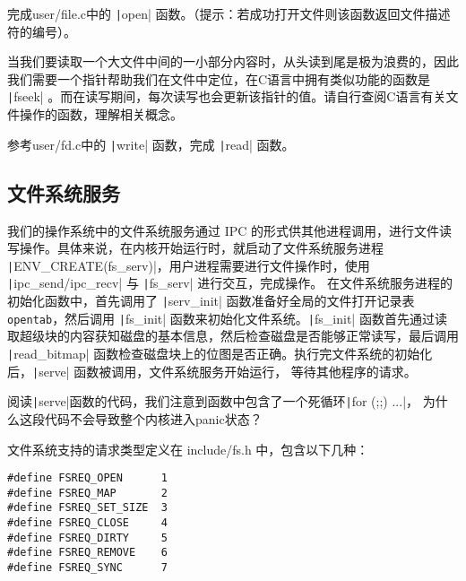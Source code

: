 \begin{exercise}
完成user/file.c中的 \texttt|open| 函数。（提示：若成功打开文件则该函数返回文件描述符的编号）。
\end{exercise}

当我们要读取一个大文件中间的一小部分内容时，从头读到尾是极为浪费的，因此我们需要一个指针帮助我们在文件中定位，在C语言中拥有类似功能的函数是 \texttt|fseek| 。而在读写期间，每次读写也会更新该指针的值。请自行查阅C语言有关文件操作的函数，理解相关概念。

\begin{exercise}
参考user/fd.c中的 \texttt|write| 函数，完成 \texttt|read| 函数。
\end{exercise}


\subsection{文件系统服务}

我们的操作系统中的文件系统服务通过 IPC 的形式供其他进程调用，进行文件读写操作。具体来说，在内核开始运行时，就启动了文件系统服务进程 \texttt|ENV_CREATE(fs_serv)|，用户进程需要进行文件操作时，使用 \texttt|ipc_send/ipc_recv| 与 \texttt|fs_serv| 进行交互，完成操作。
在文件系统服务进程的初始化函数中，首先调用了 \texttt|serv_init| 函数准备好全局的文件打开记录表
\texttt{opentab}，然后调用 \texttt|fs_init| 函数来初始化文件系统。\texttt|fs_init|
函数首先通过读取超级块的内容获知磁盘的基本信息，然后检查磁盘是否能够正常读写，最后调用 \texttt|read_bitmap|
函数检查磁盘块上的位图是否正确。执行完文件系统的初始化后，\texttt|serve| 函数被调用，文件系统服务开始运行，
等待其他程序的请求。

\begin{thinking}\label{think-fs-serve}
阅读\texttt|serve|函数的代码，我们注意到函数中包含了一个死循环\texttt|for (;;) {...}|，
为什么这段代码不会导致整个内核进入panic状态？
\end{thinking}

文件系统支持的请求类型定义在 include/fs.h 中，包含以下几种：

\begin{verbatim}
#define FSREQ_OPEN      1
#define FSREQ_MAP       2
#define FSREQ_SET_SIZE  3
#define FSREQ_CLOSE     4
#define FSREQ_DIRTY     5
#define FSREQ_REMOVE    6
#define FSREQ_SYNC      7
\end{verbatim}

